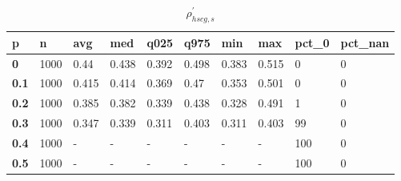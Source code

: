 \begin{table}[h]
 \centering 
\footnotesize
\caption{$\rho_{hscg,s}^\prime $}
\label{tab:alphahscgs}
\begin{tabular}[h]{|l|l|l|l|l|l|l|l|l|l|
    } \hline
\textbf{ p} & \textbf{ n} & \textbf{ avg} & \textbf{ med} & \textbf{ q025} & \textbf{ q975} & \textbf{ min} & \textbf{ max} & \textbf{ pct\_0} & \textbf{ pct\_nan}
    \\ \hline
  \textbf{  0} & 1000 &  0.44 & 0.438 & 0.392 & 0.498 & 0.383 & 0.515 &   0 & 0
    \\ \hline
  \textbf{0.1} & 1000 & 0.415 & 0.414 & 0.369 &  0.47 & 0.353 & 0.501 &   0 & 0
    \\ \hline
  \textbf{0.2} & 1000 & 0.385 & 0.382 & 0.339 & 0.438 & 0.328 & 0.491 &   1 & 0
    \\ \hline
  \textbf{0.3} & 1000 & 0.347 & 0.339 & 0.311 & 0.403 & 0.311 & 0.403 &  99 & 0
    \\ \hline
  \textbf{0.4} & 1000 & - & - & - & - & - & - & 100 & 0
    \\ \hline
  \textbf{0.5} & 1000 & - & - & - & - & - & - & 100 & 0
    \\ \hline
 \end{tabular}
 \end{table}
